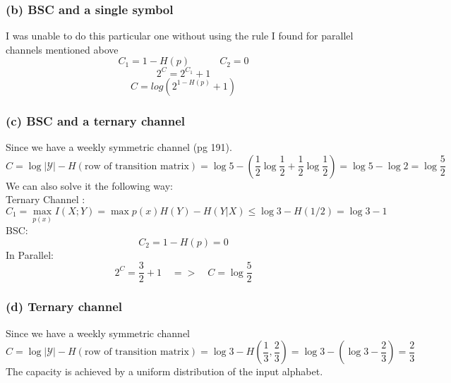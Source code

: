 \documentclass[11pt, oneside]{book}   	%
\begin{document}
\subsubsection{(b) BSC and a single symbol}
I was unable to do this particular one without using the rule I found for parallel channels mentioned above 
$$C_1=1-H(p) \quad \quad \quad C_2=0$$
$$2^C = 2^{C_1}+1$$
$$C=log(2^{1-H(p)}+1)$$
\subsubsection{(c) BSC and a ternary channel}
Since we have a weekly symmetric channel (pg 191).
$$C=\log{|\mathcal{Y}|}-H(\text{row of transition matrix})=\log{5}-(\frac{1}{2}\log{\frac{1}{2}}+\frac{1}{2}\log{\frac{1}{2}})=\log{5}-\log{2}=\log{\frac{5}{2}}$$
We can also solve it the following way:\\
Ternary Channel : $$C_1=\max_{p(x)}I(X;Y)=\max{p(x)}H(Y)-H(Y|X) \leq \log{3} - H(1/2) = \log{3}-1$$
BSC: $$C_2=1-H(p)=0$$
In Parallel:$$2^C=\frac{3}{2}+1 \quad => \quad C = \log{\frac{5}{2}}$$
\subsubsection{(d) Ternary channel}
Since we have a weekly symmetric channel
$$C=\log{|\mathcal{Y}|}-H(\text{row of transition matrix})=\log{3}-H(\frac{1}{3}, \frac{2}{3})=\log{3}-(\log{3}-\frac{2}{3})=\frac{2}{3}$$
The capacity is achieved by a uniform distribution of the input alphabet.
\end{document}
